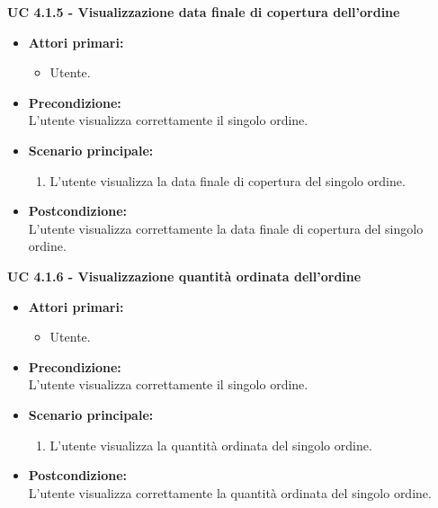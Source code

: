 \vspace{0.5cm}

\noindent \textbf{\large UC 4.1.5 - Visualizzazione data finale di copertura dell'ordine}
\label{uc:visualizzazione-data-finale-copertura}
\begin{itemize}

	\item \textbf{Attori primari: }
		\begin{itemize}
			\item Utente.
		\end{itemize}

	\item \textbf{Precondizione: }\\[0.3cm]
		L'utente visualizza correttamente il singolo ordine.

	\item \textbf{Scenario principale: }
		\begin{enumerate}
			\item L'utente visualizza la data finale di copertura del singolo ordine.
		\end{enumerate}
		

	\item \textbf{Postcondizione: }\\[0.3cm]
		L'utente visualizza correttamente la data finale di copertura del singolo ordine.

\end{itemize}

\vspace{0.5cm}

\noindent \textbf{\large UC 4.1.6 - Visualizzazione quantità ordinata dell'ordine}
\label{uc:visualizzazione-quantita-ordinata}
\begin{itemize}

	\item \textbf{Attori primari: }
		\begin{itemize}
			\item Utente.
		\end{itemize}

	\item \textbf{Precondizione: }\\[0.3cm]
		L'utente visualizza correttamente il singolo ordine.

	\item \textbf{Scenario principale: }
		\begin{enumerate}
			\item L'utente visualizza la quantità ordinata del singolo ordine.
		\end{enumerate}
		

	\item \textbf{Postcondizione: }\\[0.3cm]
		L'utente visualizza correttamente la quantità ordinata del singolo ordine.

\end{itemize}


